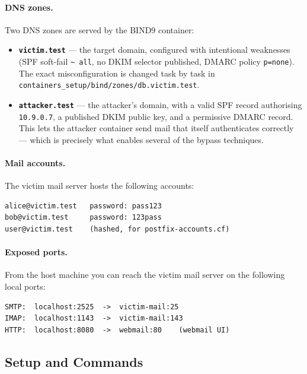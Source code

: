 \documentclass[11pt]{article}
\begin{document}
\paragraph{DNS zones.}
Two DNS zones are served by the BIND9 container:

\begin{itemize}[noitemsep]
  \item \textbf{\texttt{victim.test}} --- the target domain, configured
    with intentional weaknesses (SPF soft-fail \texttt{\textasciitilde
    all}, no DKIM selector published, DMARC policy \texttt{p=none}).
    The exact misconfiguration is changed task by task in
    \texttt{containers\_setup/bind/zones/db.victim.test}.
  \item \textbf{\texttt{attacker.test}} --- the attacker's domain, with
    a valid SPF record authorising \texttt{10.9.0.7}, a published DKIM
    public key, and a permissive DMARC record. This lets the attacker
    container send mail that itself authenticates correctly --- which
    is precisely what enables several of the bypass techniques.
\end{itemize}

\paragraph{Mail accounts.}
The victim mail server hosts the following accounts:

\begin{listing}[H]
\begin{verbatim}
alice@victim.test   password: pass123
bob@victim.test     password: 123pass
user@victim.test    (hashed, for postfix-accounts.cf)
\end{verbatim}
\end{listing}

\paragraph{Exposed ports.}
From the host machine you can reach the victim mail server on the
following local ports:

\begin{listing}[H]
\begin{verbatim}
SMTP:  localhost:2525  ->  victim-mail:25
IMAP:  localhost:1143  ->  victim-mail:143
HTTP:  localhost:8080  ->  webmail:80    (webmail UI)
\end{verbatim}
\end{listing}

\subsection{Setup and Commands}
\end{document}

